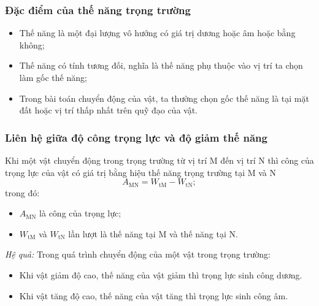 \subsubsection{Đặc điểm của thế năng trọng trường}

\begin{itemize}
	\item Thế năng là một đại lượng vô hướng có giá trị dương hoặc âm hoặc bằng không;
	\item Thế năng có tính tương đối, nghĩa là thế năng phụ thuộc vào vị trí ta chọn làm gốc thế năng;
	\item Trong bài toán chuyển động của vật, ta thường chọn gốc thế năng là tại mặt đất hoặc vị trí thấp nhất trên quỹ đạo của vật.
\end{itemize}
\subsubsection{Liên hệ giữa độ công trọng lực và độ giảm thế năng}

Khi một vật chuyển động trong trọng trường từ vị trí M đến vị trí N thì công của trọng lực của vật có giá trị bằng hiệu thế năng trọng trường tại M và N
\begin{equation*}
	A_\text{MN}=W_{\text{tM}}-W_{\text{tN}};
\end{equation*}
trong đó:
\begin{itemize}
	\item $A_\text{MN}$ là công của trọng lực;
	\item $W_{\text{tM}}$ và $W_{\text{tN}}$ lần lượt là thế năng tại M và thế năng tại N.
\end{itemize}

\textit{Hệ quả:} Trong quá trình chuyển động của một vật trong trọng trường:

\begin{itemize}
	\item Khi vật giảm độ cao, thế năng của vật giảm thì trọng lực sinh công dương.
	\item Khi vật tăng độ cao, thế năng của vật tăng thì trọng lực sinh công âm.
\end{itemize}
